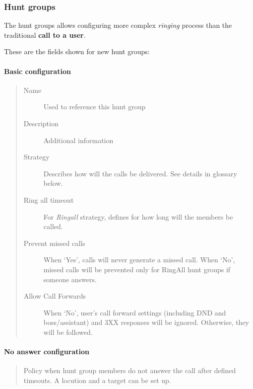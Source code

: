 \documentclass[letterpaper,10pt,english]{sphinxmanual}
\begin{document}
\subsubsection{Hunt groups}
\label{administration_portal/client/vpbx/routing_endpoints/hunt_groups:hunt-groups}\label{administration_portal/client/vpbx/routing_endpoints/hunt_groups::doc}\label{administration_portal/client/vpbx/routing_endpoints/hunt_groups:huntgroups}
The hunt groups allows configuring more complex \emph{ringing} process than the
traditional \textbf{call to a user}.

These are the fields shown for new hunt groups:


\paragraph{Basic configuration}
\label{administration_portal/client/vpbx/routing_endpoints/hunt_groups:basic-configuration}\begin{quote}
\begin{description}
\item[{Name}] \leavevmode
Used to reference this hunt group

\item[{Description}] \leavevmode
Additional information

\item[{Strategy}] \leavevmode
Describes how will the calls be delivered. See details in glossary below.

\item[{Ring all timeout}] \leavevmode
For \emph{Ringall} strategy, defines for how long will the members be called.

\item[{Prevent missed calls}] \leavevmode
When `Yes', calls will never generate a missed call. When `No', missed calls will be prevented only for RingAll
hunt groups if someone answers.

\item[{Allow Call Forwards}] \leavevmode
When `No', user's call forward settings (including DND and boss/assistant) and 3XX responses will be ignored. Otherwise, they will be followed.

\end{description}
\end{quote}


\paragraph{No answer configuration}
\label{administration_portal/client/vpbx/routing_endpoints/hunt_groups:no-answer-configuration}\begin{quote}

Policy when hunt group members do not answer the call after defined timeouts.
A locution and a target can be set up.
\end{quote}
\end{document}
